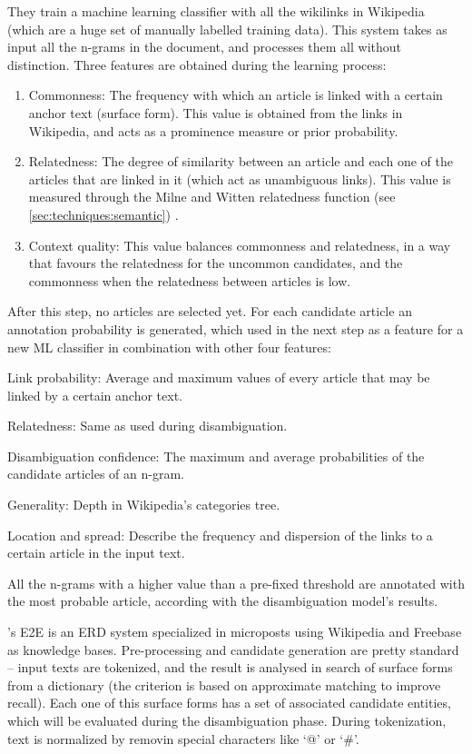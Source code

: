 They train a machine learning classifier with all the wikilinks in Wikipedia (which are a huge set of manually labelled training data). This system takes as input all the n-grams in the document, and processes them all without distinction. Three features are obtained during the learning process:
%
\begin{enumerate}
	\item Commonness: The frequency with which an article is linked with a certain anchor text (surface form). This value is obtained from the links in Wikipedia, and acts as a prominence measure or prior probability.
	\item Relatedness: The degree of similarity between an article and each one of the articles that are linked in it (which act as unambiguous links). This value is measured through the Milne and Witten relatedness function (see \autoref{sec:techniques:semantic}) \cite{witten2008}.
	\item Context quality: This value balances commonness and relatedness, in a way that favours the relatedness for the uncommon candidates, and the commonness when the relatedness between articles is low.
\end{enumerate}
%
After this step, no articles are selected yet. For each candidate article an annotation probability is generated, which used in the next step as a feature for a new ML classifier in combination with other four features:
%
\begin{enumerate*}
	\item Link probability: Average and maximum values of every article that may be linked by a certain anchor text.
	\item Relatedness: Same as used during disambiguation.
	\item Disambiguation confidence: The maximum and average probabilities of the candidate articles of an n-gram.
	\item Generality: Depth in Wikipedia's categories tree.
	\item Location and spread: Describe the frequency and dispersion of the links to a certain article in the input text.
\end{enumerate*}
%
All the n-grams with a higher value than a pre-fixed threshold are annotated with the most probable article, according with the disambiguation model's results.

\medskip

\cite{chang2014}'s E2E is an ERD system specialized in microposts using Wikipedia and Freebase as knowledge bases. Pre-processing and candidate generation are pretty standard -- input texts are tokenized, and the result is analysed in search of surface forms from a dictionary (the criterion is based on approximate matching to improve recall). Each one of this surface forms has a set of associated candidate entities, which will be evaluated during the disambiguation phase. During tokenization, text is normalized by removin special characters like `@' or `\#'.

